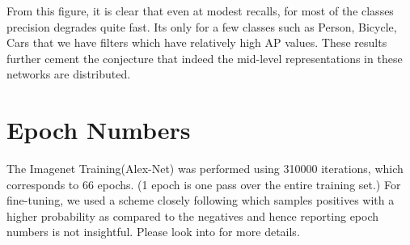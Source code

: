 \documentclass[runningheads]{llncs}
\begin{document}
From this figure, it is clear that even at modest recalls, for most of the classes precision degrades quite fast. Its only for a few classes such as Person, Bicycle, Cars that we have filters which have relatively high AP values. These results further cement the conjecture that indeed the mid-level representations in these networks are distributed.

\section{Epoch Numbers}
The Imagenet Training(Alex-Net) was performed using 310000 iterations, which corresponds to 66 epochs. (1 epoch is one pass over the entire training set.) For fine-tuning, we used a scheme closely following \cite{Rcnn} which samples positives with a higher probability as compared to the negatives and hence reporting epoch numbers is not insightful. Please look into \cite{Rcnn} for more details.



\end{document}
